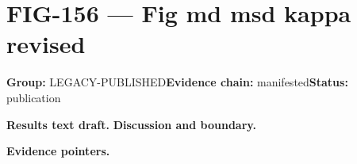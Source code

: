 \clearpage
\section{FIG-156 --- Fig md msd kappa revised}
\label{figpage:fig-156}
\textbf{Group:} LEGACY-PUBLISHED\quad \textbf{Evidence chain:} manifested\quad \textbf{Status:} publication

\textbf{Results text draft.} 
\textbf{Discussion and boundary.} 


\textbf{Evidence pointers.}



\vfill
